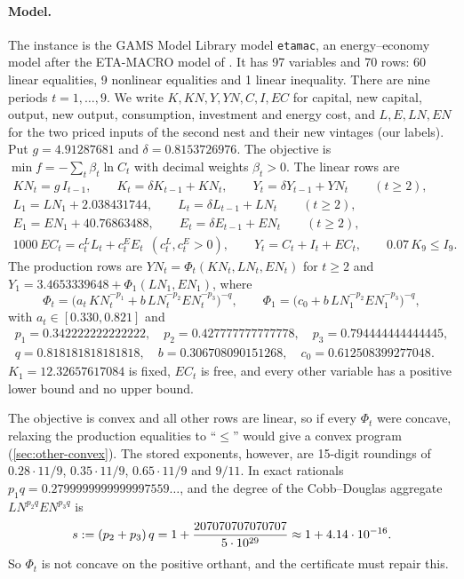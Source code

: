 \paragraph{Model.}
The instance is the GAMS Model Library model \texttt{etamac}, an energy--economy model after the ETA-MACRO model of \citet{manne1977-eta-macro-a-model-of}.
It has 97 variables and 70 rows: 60 linear equalities, 9 nonlinear equalities and 1 linear inequality.
There are nine periods $t=1,\dots,9$.
We write $K,K\!N,Y,Y\!N,C,I,E\!C$ for capital, new capital, output, new output, consumption, investment and energy cost,
and $L,E,L\!N,E\!N$ for the two priced inputs of the second nest and their new vintages (our labels).
Put $g=4.91287681$ and $\delta=0.8153726976$.
The objective is $\min f=-\sum_t\beta_t\ln C_t$ with decimal weights $\beta_t>0$.
The linear rows are
\begin{gather*}
K\!N_t=g\,I_{t-1},\qquad K_t=\delta K_{t-1}+K\!N_t,\qquad Y_t=\delta Y_{t-1}+Y\!N_t\qquad(t\ge2),\\
L_1=L\!N_1+2.038431744,\qquad L_t=\delta L_{t-1}+L\!N_t\qquad(t\ge2),\\
E_1=E\!N_1+40.76863488,\qquad E_t=\delta E_{t-1}+E\!N_t\qquad(t\ge2),\\
1000\,E\!C_t=c^L_tL_t+c^E_tE_t\ \ (c^L_t,c^E_t>0),\qquad Y_t=C_t+I_t+E\!C_t,\qquad 0.07\,K_9\le I_9 .
\end{gather*}
The production rows are $Y\!N_t=\Phi_t(K\!N_t,L\!N_t,E\!N_t)$ for $t\ge2$ and $Y_1=3.4653339648+\Phi_1(L\!N_1,E\!N_1)$, where
\[
\Phi_t=\bigl(a_t\,K\!N_t^{-p_1}+b\,L\!N_t^{-p_2}E\!N_t^{-p_3}\bigr)^{-q},\qquad
\Phi_1=\bigl(c_0+b\,L\!N_1^{-p_2}E\!N_1^{-p_3}\bigr)^{-q},
\]
with $a_t\in[0.330,0.821]$ and
\begin{gather*}
p_1=0.342222222222222,\quad p_2=0.427777777777778,\quad p_3=0.794444444444445,\\
q=0.818181818181818,\quad b=0.306708090151268,\quad c_0=0.612508399277048.
\end{gather*}
$K_1=12.32657617084$ is fixed, $E\!C_t$ is free, and every other variable has a positive lower bound and no upper bound.

The objective is convex and all other rows are linear, so if every $\Phi_t$ were concave, relaxing the production equalities to ``$\le$'' would give a convex program (\cref{sec:other-convex}).
The stored exponents, however, are 15-digit roundings of $0.28\cdot11/9$, $0.35\cdot11/9$, $0.65\cdot11/9$ and $9/11$.
In exact rationals $p_1q=0.2799999999999997559\ldots$, and the degree of the Cobb--Douglas aggregate $L\!N^{p_2q}E\!N^{p_3q}$ is
\[
s:=(p_2+p_3)\,q=1+\frac{207070707070707}{5\cdot10^{29}}\approx1+4.14\cdot 10^{-16}.
\]
So $\Phi_t$ is not concave on the positive orthant, and the certificate must repair this.

